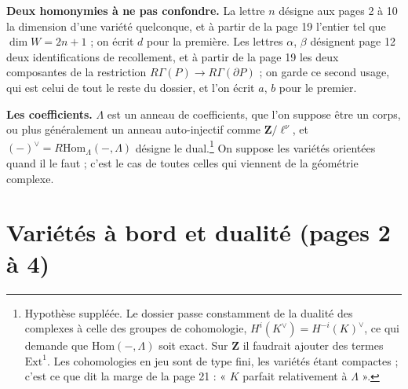 \documentclass[11pt,a4paper]{article}
\begin{document}
\textbf{Deux homonymies à ne pas confondre.} La lettre $n$ désigne aux pages 2
à 10 la dimension d'une variété quelconque, et à partir de la page 19 l'entier
tel que $\dim W = 2n+1$ ; on écrit $d$ pour la première. Les lettres $\alpha$,
$\beta$ désignent page 12 deux identifications de recollement, et à partir de
la page 19 les deux composantes de la restriction
$R\Gamma(P) \to R\Gamma(\partial P)$ ; on garde ce second usage, qui est celui
de tout le reste du dossier, et l'on écrit $a$, $b$ pour le premier.

\textbf{Les coefficients.} $\Lambda$ est un anneau de coefficients, que l'on
suppose être un corps, ou plus généralement un anneau auto-injectif comme
$\mathbf{Z}/\ell^{\nu}$, et $(-)^{\vee} = R\mathrm{Hom}_{\Lambda}(-, \Lambda)$
désigne le dual.\footnote{Hypothèse suppléée. Le dossier passe constamment de
la dualité des complexes à celle des groupes de cohomologie,
$H^{i}(K^{\vee}) = H^{-i}(K)^{\vee}$, ce qui demande que
$\mathrm{Hom}(-, \Lambda)$ soit exact. Sur $\mathbf{Z}$ il faudrait ajouter des
termes $\mathrm{Ext}^{1}$. Les cohomologies en jeu sont de type fini, les
variétés étant compactes ; c'est ce que dit la marge de la page 21 : « $K$
parfait relativement à $\Lambda$ ».} On suppose les variétés orientées quand
il le faut ; c'est le cas de toutes celles qui viennent de la géométrie
complexe.

\section*{Variétés à bord et dualité (pages 2 à 4)}
\end{document}
